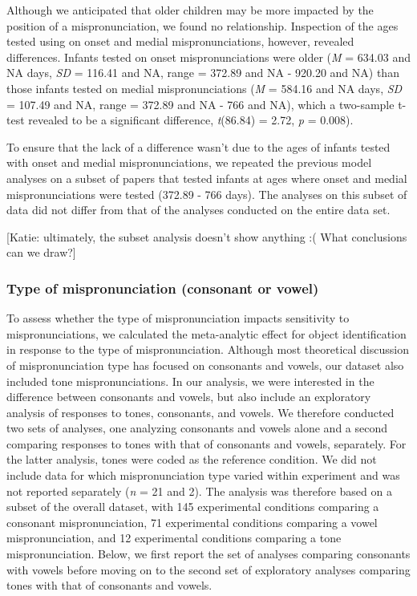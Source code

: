 \documentclass[man]{apa6}
\theoremstyle{definition}
\theoremstyle{definition}
\theoremstyle{definition}
\theoremstyle{remark}
\begin{document}
Although we anticipated that older children may be more impacted by the
position of a mispronunciation, we found no relationship. Inspection of
the ages tested using on onset and medial mispronunciations, however,
revealed differences. Infants tested on onset mispronunciations were
older (\emph{M} = 634.03 and NA days, \emph{SD} = 116.41 and NA, range =
372.89 and NA - 920.20 and NA) than those infants tested on medial
mispronunciations (\emph{M} = 584.16 and NA days, \emph{SD} = 107.49 and
NA, range = 372.89 and NA - 766 and NA), which a two-sample t-test
revealed to be a significant difference, \emph{t}(86.84) = 2.72,
\emph{p} = 0.008).

To ensure that the lack of a difference wasn't due to the ages of
infants tested with onset and medial mispronunciations, we repeated the
previous model analyses on a subset of papers that tested infants at
ages where onset and medial mispronunciations were tested (372.89 - 766
days). The analyses on this subset of data did not differ from that of
the analyses conducted on the entire data set.

{[}Katie: ultimately, the subset analysis doesn't show anything :( What
conclusions can we draw?{]}

\subsubsection{Type of mispronunciation (consonant or
vowel)}\label{type-of-mispronunciation-consonant-or-vowel}

To assess whether the type of mispronunciation impacts sensitivity to
mispronunciations, we calculated the meta-analytic effect for object
identification in response to the type of mispronunciation. Although
most theoretical discussion of mispronunciation type has focused on
consonants and vowels, our dataset also included tone mispronunciations.
In our analysis, we were interested in the difference between consonants
and vowels, but also include an exploratory analysis of responses to
tones, consonants, and vowels. We therefore conducted two sets of
analyses, one analyzing consonants and vowels alone and a second
comparing responses to tones with that of consonants and vowels,
separately. For the latter analysis, tones were coded as the reference
condition. We did not include data for which mispronunciation type
varied within experiment and was not reported separately (\emph{n} = 21
and 2). The analysis was therefore based on a subset of the overall
dataset, with 145 experimental conditions comparing a consonant
mispronunciation, 71 experimental conditions comparing a vowel
mispronunciation, and 12 experimental conditions comparing a tone
mispronunciation. Below, we first report the set of analyses comparing
consonants with vowels before moving on to the second set of exploratory
analyses comparing tones with that of consonants and vowels.
\end{document}
